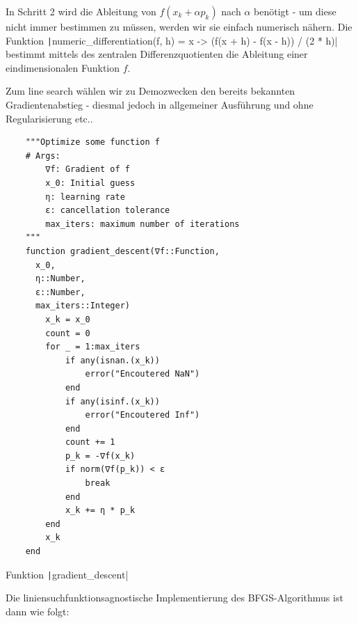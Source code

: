 \documentclass{article}
\theoremstyle{plain} %
\theoremstyle{definition} %
\begin{document}
In Schritt 2 wird die Ableitung von $f(x_k + \alpha p_k)$ nach $\alpha$ benötigt - um diese nicht immer bestimmen zu müssen, werden wir sie einfach numerisch nähern. Die Funktion \texttt|numeric_differentiation(f, h) = x -> (f(x + h) - f(x - h)) / (2 * h)| bestimmt mittels des zentralen Differenzquotienten die Ableitung einer eindimensionalen Funktion $f$.

Zum line search wählen wir zu Demozwecken den bereits bekannten Gradientenabstieg - diesmal jedoch in allgemeiner Ausführung und ohne Regularisierung etc..

\begin{listing}[H]
  \begin{verbatim}
    """Optimize some function f
    # Args:
        ∇f: Gradient of f
        x_0: Initial guess
        η: learning rate
        ε: cancellation tolerance
        max_iters: maximum number of iterations
    """
    function gradient_descent(∇f::Function,
      x_0,
      η::Number,
      ε::Number,
      max_iters::Integer)
        x_k = x_0
        count = 0
        for _ = 1:max_iters
            if any(isnan.(x_k))
                error("Encoutered NaN")
            end
            if any(isinf.(x_k))
                error("Encoutered Inf")
            end
            count += 1
            p_k = -∇f(x_k)
            if norm(∇f(p_k)) < ε
                break
            end
            x_k += η * p_k
        end
        x_k
    end
  \end{verbatim}
  \caption{Funktion \texttt|gradient_descent|}
  \label{listing:decay}
\end{listing}


Die liniensuchfunktionsagnostische Implementierung des BFGS-Algorithmus ist dann wie folgt:
\end{document}
